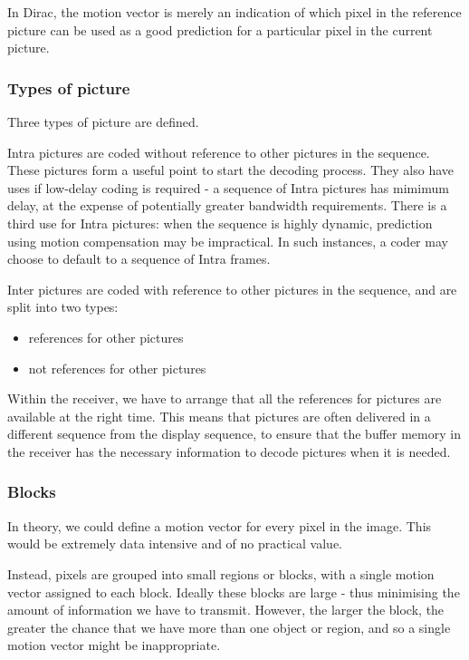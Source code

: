 In Dirac, the motion vector is merely an indication of which pixel in
the reference picture can be used as a good prediction for a particular
pixel in the current picture.

\subsubsection{Types of picture}

Three types of picture are defined.

Intra pictures are coded without reference to other pictures in the
sequence. These pictures form a useful point to start the decoding
process. They also have uses if low-delay coding is required - a
sequence of Intra pictures has mimimum delay, at the expense of
potentially greater bandwidth requirements. There is a third use for
Intra pictures: when the sequence is highly dynamic, prediction using
motion compensation may be impractical. In such instances, a coder may
choose to default to a sequence of Intra frames.

Inter pictures are coded with reference to other pictures in the
sequence, and are split into two types:
\begin{itemize}
	\item references for other pictures
	\item not references for other pictures
\end{itemize}

Within the receiver, we have to arrange that all the references for
pictures are available at the right time. This means that pictures are
often delivered in a different sequence from the display sequence, to
ensure that the buffer memory in the receiver has the necessary
information to decode pictures when it is needed.

\subsubsection{Blocks}

In theory, we could define a motion vector for every pixel in the image.
This would be extremely data intensive and of no practical value.

Instead, pixels are grouped into small regions or blocks, with a single
motion vector assigned to each block. Ideally these blocks are large -
thus minimising the amount of information we have to transmit. However,
the larger the block, the greater the chance that we have more than one
object or region, and so a single motion vector might be inappropriate.

